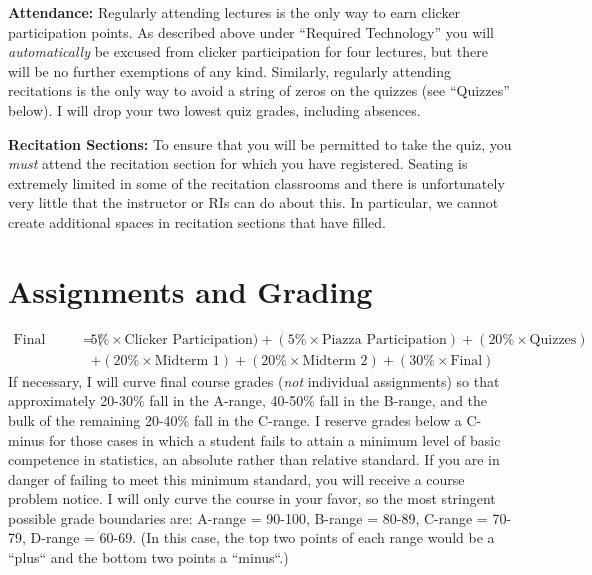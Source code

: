 \documentclass[11pt, letterpaper]{article}
\begin{document}
\bigskip

\noindent \textbf{Attendance:} 
Regularly attending lectures is the only way to earn clicker participation points. 
As described above under ``Required Technology'' you will \emph{automatically} be excused from clicker participation for four lectures, but there will be no further exemptions of any kind. 
Similarly, regularly attending recitations is the only way to avoid a string of zeros on the quizzes (see ``Quizzes'' below). 
I will drop your two lowest quiz grades, including absences.

\bigskip

\noindent \textbf{Recitation Sections:} 
To ensure that you will be permitted to take the quiz, you \emph{must} attend the recitation section for which you have registered.
Seating is extremely limited in some of the recitation classrooms and there is unfortunately very little that the instructor or RIs can do about this.
In particular, we cannot create additional spaces in recitation sections that have filled.




\newpage

\section*{Assignments and Grading}
	\begin{equation*}
	\begin{split}
		\mbox{Final Grade} = (&5\% \times \mbox{Clicker Participation}) + (5\% \times \mbox{Piazza Participation}) + (20\% \times \mbox{Quizzes})  \\ &
							 + (20\% \times \mbox{Midterm 1}) + (20\% \times \mbox{Midterm 2}) + (30\% \times \mbox{Final})
	\end{split}
	\end{equation*}
If necessary, I will curve final course grades (\emph{not} individual assignments) so that approximately 20-30\% fall in the A-range, 40-50\% fall in the B-range, and the bulk of the remaining 20-40\% fall in the C-range. 
I reserve grades below a C-minus for those cases in which a student fails to attain a minimum level of basic competence in statistics, an absolute rather than relative standard. 
If you are in danger of failing to meet this minimum standard, you will receive a course problem notice.
I will only curve the course in your favor, so the most stringent possible grade boundaries are: A-range = 90-100, B-range = 80-89, C-range = 70-79, D-range = 60-69.
(In this case, the top two points of each range would be a ``plus`` and the bottom two points a ``minus``.)
\end{document}
